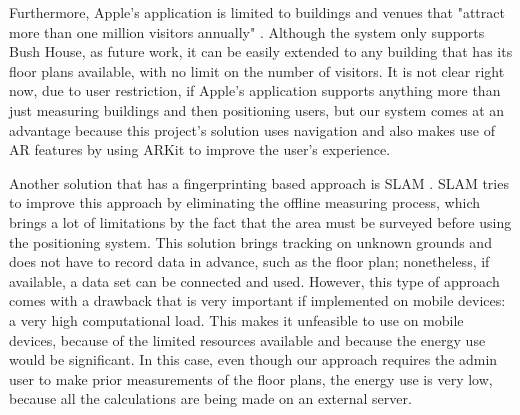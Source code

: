 Furthermore, Apple's application is limited to buildings and venues that "attract more than one million visitors annually" \cite{apple-indoor-survey}. Although the system only supports Bush House, as future work, it can be easily extended to any building that has its floor plans available, with no limit on the number of visitors. It is not clear right now, due to user restriction, if Apple's application supports anything more than just measuring buildings and then positioning users, but our system comes at an advantage because this project's solution uses navigation and also makes use of AR features by using ARKit to improve the user's experience.

Another solution that has a fingerprinting based approach is SLAM \cite{SLAM}. SLAM tries to improve this approach by eliminating the offline measuring process, which brings a lot of limitations by the fact that the area must be surveyed before using the positioning system. This solution brings tracking on unknown grounds and does not have to record data in advance, such as the floor plan; nonetheless, if available, a data set can be connected and used. However, this type of approach comes with a drawback that is very important if implemented on mobile devices: a very high computational load. This makes it unfeasible to use on mobile devices, because of the limited resources available and because the energy use would be significant. In this case, even though our approach requires the admin user to make prior measurements of the floor plans, the energy use is very low, because all the calculations are being made on an external server.
